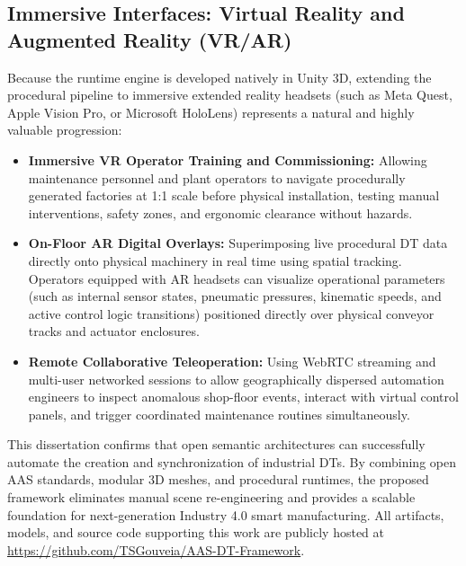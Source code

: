 \subsection{Immersive Interfaces: Virtual Reality and Augmented Reality (\texorpdfstring{\gls{VR}}{VR}/\texorpdfstring{\gls{AR}}{AR})}
Because the runtime engine is developed natively in Unity 3D, extending the procedural pipeline to immersive extended reality headsets (such as Meta Quest, Apple Vision Pro, or Microsoft HoloLens) represents a natural and highly valuable progression:
\begin{itemize}
    \item \textbf{Immersive \gls{VR} Operator Training and Commissioning:} Allowing maintenance personnel and plant operators to navigate procedurally generated factories at 1:1 scale before physical installation, testing manual interventions, safety zones, and ergonomic clearance without hazards.
    \item \textbf{On-Floor \gls{AR} Digital Overlays:} Superimposing live procedural \gls{DT} data directly onto physical machinery in real time using spatial tracking. Operators equipped with \gls{AR} headsets can visualize operational parameters (such as internal sensor states, pneumatic pressures, kinematic speeds, and active control logic transitions) positioned directly over physical conveyor tracks and actuator enclosures.
    \item \textbf{Remote Collaborative Teleoperation:} Using WebRTC streaming and multi-user networked sessions to allow geographically dispersed automation engineers to inspect anomalous shop-floor events, interact with virtual control panels, and trigger coordinated maintenance routines simultaneously.
\end{itemize}

This dissertation confirms that open semantic architectures can successfully automate the creation and synchronization of industrial \glspl{DT}. By combining open \gls{AAS} standards, modular 3D meshes, and procedural runtimes, the proposed framework eliminates manual scene re-engineering and provides a scalable foundation for next-generation Industry 4.0 smart manufacturing. All artifacts, models, and source code supporting this work are publicly hosted at \url{https://github.com/TSGouveia/AAS-DT-Framework}.